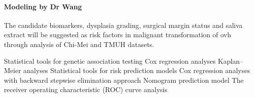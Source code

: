 \documentclass[12pt, a4paper]{article}
\begin{document}










\paragraph{Modeling by Dr Wang}

The candidate biomarkers, dysplasia grading, surgical margin status and saliva extract will be suggested as risk factors in malignant transformation of \acrshort{ovh} through analysis of Chi-Mei and TMUH datasets.

\begin{outline}


\1 Statistical tools for genetic association testing 
\1 Cox regression analyses
\1 Kaplan--Meier analyses \1 Statistical tools for risk prediction models 
\1 Cox regression analyses
with backward stepwise elimination approach
\1 Nomogram prediction model
\1 The receiver operating characteristic (ROC) curve analysis

\end{outline}
\end{document}
